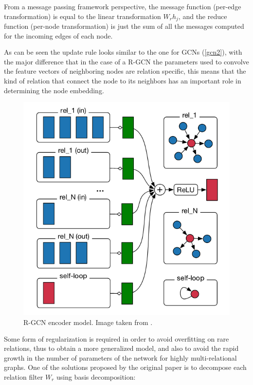 \documentclass[%
    corpo=13.5pt,
    twoside,
    oldstyle,
    tipotesi=magistrale,
    greek,
    evenboxes
]{toptesi}
\begin{document}
From a message passing framework perspective, the message function (per-edge
transformation) is equal to the linear transformation $W_rh_j$, and the reduce
function (per-node transformation) is just the sum of
all the messages computed for the incoming edges of each node.

As can be seen the update rule looks similar to the one for GCNs (\ref{gcn2}),
with the major difference that in the case of a R-GCN the parameters used to
convolve the
feature vectors of neighboring nodes are relation specific, this means that
the kind of relation that connect the node to its neighbors has an important
role in determining the node embedding.

\begin{figure}[h]
    \centering
    \includegraphics[scale=0.5]{img/rgcn-encoder.png}
    \caption{R-GCN encoder model. Image taken from \cite{schlichtkrull2018}.}
    \label{fig:rgcn-encoder}
\end{figure}

Some form of regularization is required in order to avoid overfitting on rare
relations, thus to obtain a more generalized model, and also to avoid
the rapid growth in the number of parameters of the network for
highly multi-relational graphs. One of the solutions proposed by the original
paper \cite{schlichtkrull2018} is to decompose each relation filter $W_r$
using basis decomposition:
\end{document}
